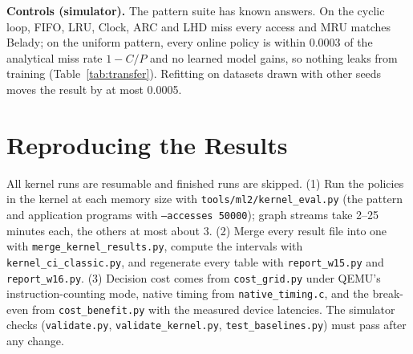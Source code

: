 \documentclass{article}
\newcommand{\clock}{Clock\xspace}
\newcommand{\belady}{Belady\xspace}
\newcommand{\wsixteen}{../week_16_update/tables}
\newcommand{\finding}[1]{\textbf{#1}\hspace{0.4em}}
\begin{document}
\begin{table}[h]
\caption{LeCaR in the simulator, faults relative to \clock, on the cells of
Table~\ref{tab:info}. ``As published'': experts exact LRU and exact LFU, which needs every
access. ``Kernel form'': experts \clock and the kernel's decayed frequency count on the
same accessed-bit snapshot, time in evictions. Both use LeCaR's original parameters
(learning rate 0.45, a history of half the cache per expert).}
\label{tab:lecar}
\vskip 0.05in
\begin{center}
\resizebox{\linewidth}{!}{}
\end{center}
\end{table}

\begin{table}[h]
\caption{Workloads no model was trained on, in the simulator: faults relative to \clock,
geometric mean over streams and the three memory sizes. ARC and S3-FIFO here are the
per-hit versions; LHD is the accessed-bit form.}
\label{tab:transfer}
\vskip 0.05in
\begin{center}
\resizebox{\linewidth}{!}{}
\end{center}
\end{table}

\finding{Controls (simulator).} The pattern suite has known answers. On the cyclic loop,
FIFO, LRU, \clock, ARC and LHD miss every access and MRU matches \belady; on the uniform
pattern, every online policy is within 0.0003 of the analytical miss rate $1-C/P$ and no
learned model gains, so nothing leaks from training (Table~\ref{tab:transfer}). Refitting
on datasets drawn with other seeds moves the result by at most 0.0005.

\section{Reproducing the Results}
\label{app:repro}

All kernel runs are resumable and finished runs are skipped. (1) Run the policies in
the kernel at each memory size with \texttt{tools/ml2/kernel\_eval.py} (the pattern and
application programs with \texttt{--accesses 50000}); graph streams take 2--25 minutes
each, the others at most about 3. (2) Merge every result file into one with
\texttt{merge\_kernel\_results.py}, compute the intervals with
\texttt{kernel\_ci\_classic.py}, and regenerate every table with \texttt{report\_w15.py}
and \texttt{report\_w16.py}. (3) Decision cost comes from \texttt{cost\_grid.py} under
QEMU's instruction-counting mode, native timing from \texttt{native\_timing.c}, and the
break-even from \texttt{cost\_benefit.py} with the measured device latencies. The
simulator checks (\texttt{validate.py}, \texttt{validate\_kernel.py},
\texttt{test\_baselines.py}) must pass after any change.
\fi
\end{document}
